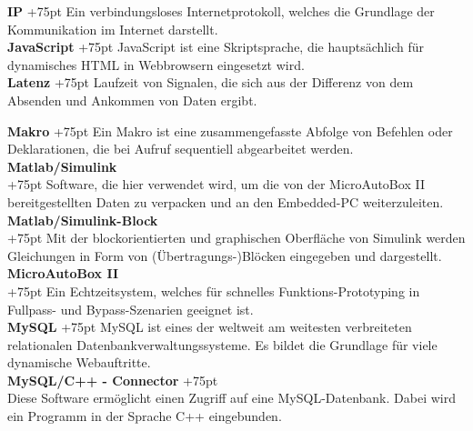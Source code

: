 \documentclass[fontsize = 12pt, paper = a4]{scrreprt}
\begin{document}
\textbf{IP}
\hangindent+75pt 
\hspace*{18.75mm}
Ein verbindungsloses Internetprotokoll, welches die Grundlage der Kommunikation im Internet darstellt.\\

\textbf{JavaScript}
\hangindent+75pt 
\hspace*{2.5mm}
JavaScript ist eine Skriptsprache, die hauptsächlich für dynamisches HTML in Webbrowsern eingesetzt wird. \\

\textbf{Latenz}
\hangindent+75pt 
\hspace*{10mm}
Laufzeit von Signalen, die sich aus der Differenz von dem Absenden und Ankommen von Daten ergibt.\\

\begin{spacing}{0.95} 

\textbf{Makro}
\hangindent+75pt 
\hspace*{9.75mm}
Ein Makro ist eine zusammengefasste Abfolge von Befehlen oder Deklarationen, die bei Aufruf sequentiell abgearbeitet werden.\\

\textbf{Matlab/Simulink} \\
\hangindent+75pt  
Software, die hier verwendet wird, um die von der MicroAutoBox II bereitgestellten Daten zu verpacken und an den Embedded-PC weiterzuleiten.\\

\textbf{Matlab/Simulink-Block} \\
\hangindent+75pt  
Mit der blockorientierten und graphischen Oberfläche von Simulink werden Gleichungen in Form von (Übertragungs-)Blöcken eingegeben und dargestellt.\\

\textbf{MicroAutoBox II} \\
\hangindent+75pt  
Ein Echtzeitsystem, welches für schnelles Funktions-Prototyping in Fullpass- und Bypass-Szenarien geeignet ist.\\


\textbf{MySQL}
\hangindent+75pt  
\hspace*{7.5mm}
MySQL ist eines der weltweit am weitesten verbreiteten relationalen Datenbankverwaltungssysteme. Es bildet die Grundlage für viele dynamische Webauftritte.\\

\textbf{MySQL/C++ - Connector}
\hangindent+75pt 
\\
Diese Software ermöglicht einen Zugriff auf eine MySQL-Datenbank. Dabei wird ein Programm in der Sprache C++ eingebunden.\\


\end{spacing}
\end{document}
